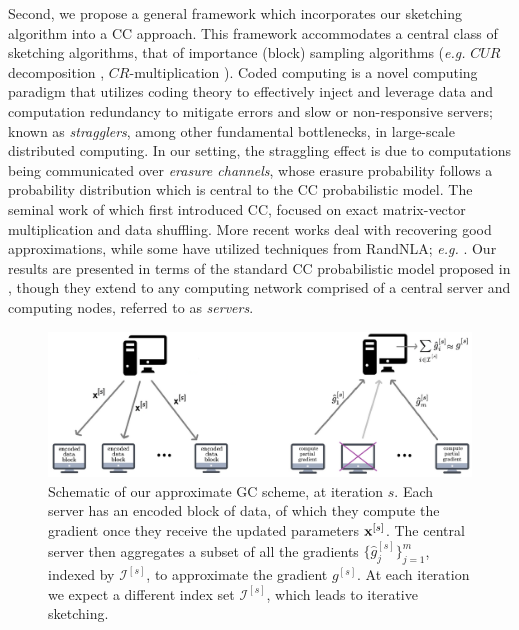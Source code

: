 \documentclass[journal,letterpaper,onecolumn,twoside,nofonttune]{IEEEtran}
\newcommand{\I}{\mathcal{I}}
\newcommand{\xb}{\bold{x}}
\newcommand{\gh}{\hat{g}}
\begin{document}
Second, we propose a general framework which incorporates our sketching algorithm into a CC approach. This framework accommodates a central class of sketching algorithms, that of importance (block) sampling algorithms (\textit{e.g.} $CUR$ decomposition \cite{OJXE18}, $CR$-multiplication \cite{CPH20c}). Coded computing is a  novel computing paradigm that utilizes coding theory to effectively inject and leverage data and computation redundancy to mitigate errors and slow or non-responsive servers; known as \textit{stragglers}, among other fundamental bottlenecks, in large-scale distributed computing. In our setting, the straggling effect is due to computations being communicated over \textit{erasure channels}, whose erasure probability follows a probability distribution which is central to the CC probabilistic model. The seminal work of \cite{LLPPR17} which first introduced CC, focused on exact matrix-vector multiplication and data shuffling. More recent works deal with recovering good approximations, while some have utilized techniques from RandNLA; \textit{e.g.} \cite{BP23,CPH20a,CPH20c,GWCR18,GKCMR20,JM21}. Our results are presented in terms of the standard CC probabilistic model proposed in \cite{LLPPR17}, though they extend to any computing network comprised of a central server and computing nodes, referred to as \textit{servers}.%
\begin{figure}[h]
  \centering
  \includegraphics[scale=.18]{block_lvg_GC_schematic.png}
  \caption{Schematic of our approximate GC scheme, at iteration $s$. Each server has an encoded block of data, of which they compute the gradient once they receive the updated parameters $\xb^{[s]}$. The central server then aggregates a subset of all the gradients $\big\{\gh_j^{[s]}\big\}_{j=1}^m$, indexed by $\I^{[s]}$, to approximate the gradient $g^{[s]}$. At each iteration we expect a different index set $\I^{[s]}$, which leads to iterative sketching.}
  \label{CG_schematic}
\end{figure}
\end{document}
